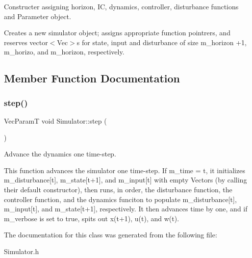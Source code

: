 Constructer assigning horizon, IC, dynamics, controller, disturbance functions and Parameter object. 

Creates a new simulator object; assigns appropriate function pointrers, and reserves vector$<$\+Vec$>$s for state, input and disturbance of size m\+\_\+horizon +1, m\+\_\+horizo, and m\+\_\+horizon, respectively. 

\subsection{Member Function Documentation}
\mbox{\label{classSimulator_a3bdb2a9b121073e71e424203a9416b04}} 
\subsubsection{\texorpdfstring{step()}{step()}}
{\footnotesize\ttfamily Vec\+ParamT void Simulator\+::step (\begin{DoxyParamCaption}{ }\end{DoxyParamCaption})}



Advance the dynamics one time-\/step. 

This function advances the simulator one time-\/step. If m\+\_\+time = t, it initializes m\+\_\+disturbance\mbox{[}t\mbox{]}, m\+\_\+state\mbox{[}t+1\mbox{]}, and m\+\_\+input\mbox{[}t\mbox{]} with empty Vectors (by calling their default constructor), then runs, in order, the disturbance function, the controller function, and the dynamics funciton to populate m\+\_\+disturbance\mbox{[}t\mbox{]}, m\+\_\+input\mbox{[}t\mbox{]}, and m\+\_\+state\mbox{[}t+1\mbox{]}, respectively. It then advances time by one, and if m\+\_\+verbose is set to true, spits out x(t+1), u(t), and w(t). 

The documentation for this class was generated from the following file\+:\begin{DoxyCompactItemize}
\item 
Simulator.\+h\end{DoxyCompactItemize}
